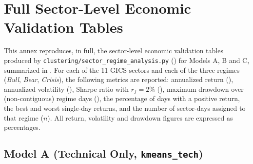 \chapter{Full Sector-Level Economic Validation Tables}
\label{annex:tables}

This annex reproduces, in full, the sector-level economic validation
tables produced by \texttt{clustering/sector\_regime\_analysis.py}
() for Models A, B and C, summarized in
. For each of the 11 GICS
sectors and each of the three regimes (\emph{Bull}, \emph{Bear},
\emph{Crisis}), the following metrics are reported: annualized return
(), annualized volatility (), Sharpe
ratio with $r_f = 2\%$ (), maximum drawdown over
(non-contiguous) regime days (), the percentage of days
with a positive return, the best and worst single-day returns, and the
number of sector-days assigned to that regime ($n$). All return, volatility
and drawdown figures are expressed as percentages.

\section{Model A (Technical Only, \texttt{kmeans\_tech})}
\label{annex:tables-modelA}

